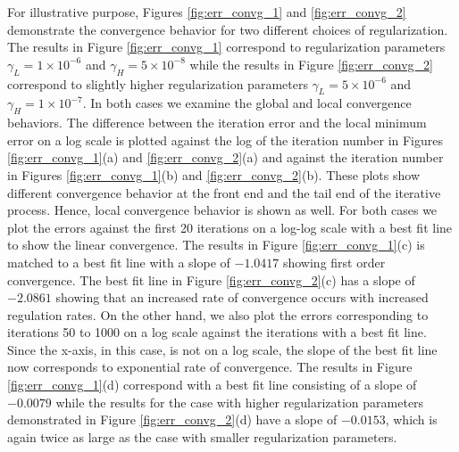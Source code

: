 For illustrative purpose, Figures \ref{fig:err_convg_1} and \ref{fig:err_convg_2} demonstrate the convergence behavior for two different choices of regularization. The results in Figure \ref{fig:err_convg_1} correspond to regularization parameters $\gamma_L = 1 \times 10^{-6}$ and $\gamma_H = 5 \times 10^{-8}$ while the results in Figure \ref{fig:err_convg_2} correspond to slightly higher regularization parameters $\gamma_L = 5 \times 10^{-6}$ and $\gamma_H = 1 \times 10^{-7}$. In both cases we examine the global and local convergence behaviors. The difference between the iteration error and the local minimum error on a log scale is plotted against the log of the iteration number in Figures \ref{fig:err_convg_1}(a) and \ref{fig:err_convg_2}(a) and against the iteration number in Figures \ref{fig:err_convg_1}(b) and \ref{fig:err_convg_2}(b). These plots show different convergence behavior at the front end and the tail end of the iterative process. Hence, local convergence behavior is shown as well. For both cases we plot the errors against the first 20 iterations on a log-log scale with a best fit line to show the linear convergence. The results in Figure \ref{fig:err_convg_1}(c) is matched to a best fit line with a slope of $-1.0417$ showing first order convergence. The best fit line in Figure \ref{fig:err_convg_2}(c) has a slope of $-2.0861$ showing that an increased rate of convergence occurs with increased regulation rates. On the other hand, we also plot the errors corresponding to iterations 50 to 1000 on a log scale against the iterations with a best fit line. Since the x-axis, in this case, is not on a log scale, the slope of the best fit line now corresponds to exponential rate of convergence. The results in Figure \ref{fig:err_convg_1}(d) correspond with a best fit line consisting of a slope of $-0.0079$ while the results for the case with higher regularization parameters demonstrated in Figure \ref{fig:err_convg_2}(d) have a slope of $-0.0153$, which is again twice as large as the case with smaller regularization parameters. 

